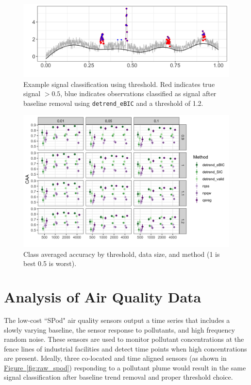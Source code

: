 \documentclass[12pt]{article}
\newcommand{\Fig}[1]{\hyperref[fig:#1]{Figure~\ref*{fig:#1}}} %
\newcommand{\Fig}[1]{{Figure~\ref{fig:#1}}} %
\begin{document}
	\begin{figure}[h!]
		\includegraphics[width = \linewidth]{Figures/peaks_eg_class.png}
		\caption{Example signal classification using threshold. Red indicates true signal $>0.5$, blue indicates observations classified as signal after baseline removal using \texttt{detrend\_eBIC} and a threshold of 1.2.}
		\label{fig:peaks_class_eg}
	\end{figure}


	\begin{figure}[h!]
		\includegraphics[width = \linewidth]{Figures/peaks_CAA.png}
		\caption{Class averaged accuracy by threshold, data size, and method (1 is best 0.5 is worst).}
	\end{figure}


	\FloatBarrier

\section{Analysis of Air Quality Data}

	\label{sec:application}
	The low-cost ``SPod" air quality sensors output a time series that includes a slowly varying baseline,
	the sensor response to pollutants, and high frequency random noise. These sensors are used to monitor pollutant concentrations at the fence lines of industrial facilities and detect time points when high concentrations are present. Ideally, three co-located and time aligned sensors (as shown in \Fig{raw_spod}) responding to a pollutant plume would result in the same signal classification after baseline trend removal and proper threshold choice.
\end{document}
